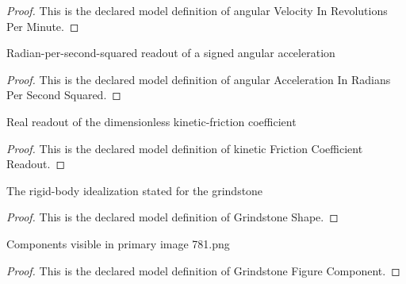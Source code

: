 \begin{proof}
  This is the declared model definition of angular Velocity In Revolutions Per Minute.
\end{proof}
\begin{definition}
  \label{def:physics:phyx-mini-0781:phyxminiproblems-problemphyxmini0781-angularaccelerationinradianspersecondsquared}
  Radian-per-second-squared readout of a signed angular acceleration
\end{definition}
\begin{proof}
  This is the declared model definition of angular Acceleration In Radians Per Second Squared.
\end{proof}
\begin{definition}
  \label{def:physics:phyx-mini-0781:phyxminiproblems-problemphyxmini0781-kineticfrictioncoefficientreadout}
  Real readout of the dimensionless kinetic-friction coefficient
\end{definition}
\begin{proof}
  This is the declared model definition of kinetic Friction Coefficient Readout.
\end{proof}
\begin{definition}
  \label{def:physics:phyx-mini-0781:phyxminiproblems-problemphyxmini0781-grindstoneshape}
  The rigid-body idealization stated for the grindstone
\end{definition}
\begin{proof}
  This is the declared model definition of Grindstone Shape.
\end{proof}
\begin{definition}
  \label{def:physics:phyx-mini-0781:phyxminiproblems-problemphyxmini0781-grindstonefigurecomponent}
  Components visible in primary image 781.png
\end{definition}
\begin{proof}
  This is the declared model definition of Grindstone Figure Component.
\end{proof}
